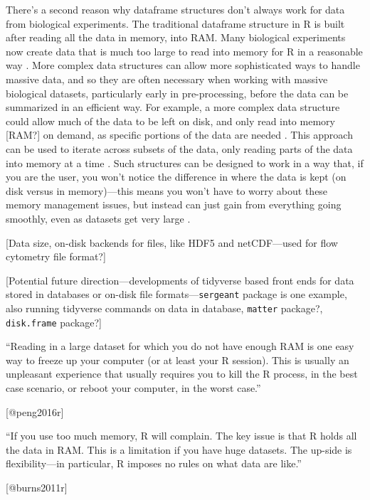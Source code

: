 \documentclass[]{tufte-book}
\begin{document}
There's a second reason why dataframe structures don't always work for data from
biological experiments. The traditional dataframe structure in R is built after
reading all the data in memory, into RAM. Many biological experiments now create
data that is much too large to read into memory for R in a reasonable way
\citep{lawrence2014scalable, hicks2021mbkmeans}. More complex data structures can
allow more sophisticated ways to handle massive data, and so they are often
necessary when working with massive biological datasets, particularly early in
pre-processing, before the data can be summarized in an efficient way. For
example, a more complex data structure could allow much of the data to be left
on disk, and only read into memory {[}RAM?{]} on demand, as specific portions of the
data are needed \citep{gatto2013msnbase, hicks2021mbkmeans}. This approach can be
used to iterate across subsets of the data, only reading parts of the data into
memory at a time \citep{lawrence2014scalable}. Such structures can be designed to
work in a way that, if you are the user, you won't notice the difference in
where the data is kept (on disk versus in memory)---this means you won't have to
worry about these memory management issues, but instead can just gain from
everything going smoothly, even as datasets get very large \citep{gatto2013msnbase}.

{[}Data size, on-disk backends for files, like HDF5 and netCDF---used for flow
cytometry file format?{]}

{[}Potential future direction---developments of tidyverse based front ends for
data stored in databases or on-disk file formats---\texttt{sergeant} package is one
example, also running tidyverse commands on data in database, \texttt{matter} package?,
\texttt{disk.frame} package?{]}

\begin{marginfigure}
``Reading in a large dataset for which you do not have enough RAM is one
easy way to freeze up your computer (or at least your R session). This
is usually an unpleasant experience that usually requires you to kill
the R process, in the best case scenario, or reboot your computer, in
the worst case.''

{[}@peng2016r{]}
\end{marginfigure}

\begin{marginfigure}
``If you use too much memory, R will complain. The key issue is that R
holds all the data in RAM. This is a limitation if you have huge
datasets. The up-side is flexibility---in particular, R imposes no rules
on what data are like.''

{[}@burns2011r{]}
\end{marginfigure}
\end{document}
